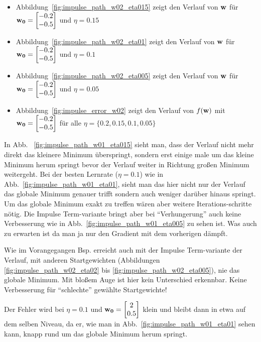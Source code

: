 \begin{itemize}
  \item Abbildung~\ref{fig:impulse_path_w02_eta015} zeigt den Verlauf von $\mathbf{w}$ für $\mathbf{w_0} = \begin{bmatrix} -0.2 \\ -0.5 \end{bmatrix}$ und $\eta = 0.15$
  \item Abbildung~\ref{fig:impulse_path_w02_eta01} zeigt den Verlauf von $\mathbf{w}$ für $\mathbf{w_0} = \begin{bmatrix} -0.2 \\ -0.5 \end{bmatrix}$ und $\eta = 0.1$
  \item Abbildung~\ref{fig:impulse_path_w02_eta005} zeigt den Verlauf von $\mathbf{w}$ für $\mathbf{w_0} = \begin{bmatrix} -0.2 \\ -0.5 \end{bmatrix}$ und $\eta = 0.05$
  \item Abbildung~\ref{fig:impulse_error_w02} zeigt den Verlauf von $f(\mathbf{w})$ mit $\mathbf{w_0} = \begin{bmatrix} -0.2 \\ -0.5 \end{bmatrix}$ für alle $\eta = \{0.2, 0.15, 0.1, 0.05\}$
\end{itemize}

In Abb. ~\ref{fig:impulse_path_w01_eta015} sieht man, dass der Verlauf nicht mehr direkt das kleinere Minimum überspringt, sondern erst einige male um das kleine Minimum herum springt bevor der Verlauf weiter in Richtung großen Minimum weitergeht. Bei der besten Lernrate ($\eta =0.1$) wie in Abb.~\ref{fig:impulse_path_w01_eta01}, sieht man das hier nicht nur der Verlauf das globale Minimum genauer trifft sondern auch weniger darüber hinaus springt. Um das globale Minimum exakt zu treffen wären aber weitere Iterations-schritte nötig. Die Impulse Term-variante  bringt aber bei ``Verhungerung'' auch keine Verbesserung wie in Abb.~\ref{fig:impulse_path_w01_eta005} zu sehen ist. Was auch zu erwarten ist da man ja nur den Gradient mit dem vorherigen dämpft.

Wie im Vorangegangen Bsp. erreicht auch mit der Impulse Term-variante der Verlauf, mit anderen Startgewichten (Abbildungen \ref{fig:impulse_path_w02_eta02} bis \ref{fig:impulse_path_w02_eta005}), nie das globale Minimum. Mit bloßem Auge ist hier kein Unterschied erkennbar. Keine Verbesserung für ``schlechte'' gewählte Startgewichte!


Der Fehler wird bei $\eta = 0.1$ und $\mathbf{w_0} = \begin{bmatrix} 2 \\ 0.5 \end{bmatrix}$  klein und bleibt dann in etwa  auf dem selben Niveau, da er, wie man in Abb.~\ref{fig:impulse_path_w01_eta01} sehen kann, knapp rund um das globale Minimum herum springt.





